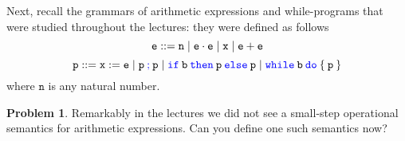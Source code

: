 \documentclass[a4paper, 11pt]{article}
\theoremstyle{definition}
\newtheorem{problem}{Problem}
\newcommand{\blue}[1]{\textcolor{blue}{#1}}
\begin{document}
        Next, recall the grammars of arithmetic expressions and while-programs
        that were studied throughout the lectures: they were defined as
        follows
        \[
                \mathtt{e} ::=  \mathtt{n}  \mid \mathtt{e \cdot e}
                \mid  \mathtt{x}  \mid \mathtt{e + e}
        \]
        \[
                \prog{p} ::= \mathtt{x} := \mathtt{e} \mid
        	\mathtt{p \> \blue{;} \> p} \mid
        	\mathtt{\blue{if} \> b \> \blue{then} \> p \> \blue{else} \> p} \mid
        	\mathtt{\blue{while} \> b \> \blue{do} \> \{ \> p \> \}}
        \]
        where $\mathtt{n}$ is any natural number.
        \begin{problem}
                Remarkably in the lectures we did not see a small-step
                operational semantics for arithmetic expressions. Can you
                define one such semantics now?
        \end{problem}
\end{document}
